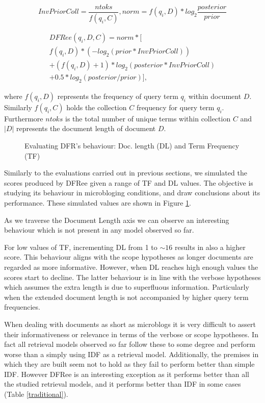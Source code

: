 \begin{equation}
InvPriorColl = \frac{ntoks}{f(q_i, C)}, norm = f(q_i, D)*log_2{\frac{posterior}{prior}}
\end{equation}

\begin{multline}
DFRee(q_i,D,C) = norm * [                    \\
f(q_i, D)*(-log_2(prior*InvPriorColl))       \\
+(f(q_i, D)+1)*log_2(posterior*InvPriorColl) \\
+ 0.5*log_2(posterior/prior)],
\end{multline}

where \(f(q_i, D)\) represents the frequency of query term \(q_i\) within document \(D\). Similarly \(f(q_i, C)\) holds the collection \(C\) frequency for query term \(q_i\). Furthermore \(ntoks\) is the total number of unique terms within collection \(C\) and \(|D|\) represents the document length of document \(D\).

\begin{figure}
	\centering
	\caption{Evaluating DFR's behaviour: Doc. length (DL) and Term Frequency (TF)}
	
	\label{dfrTFDLcomp}
\end{figure} 

Similarly to the evaluations carried out in previous sections, we simulated the scores produced by DFRee given a range of TF and DL values. The objective is studying its behaviour in microbloging conditions, and draw conclusions about its performance. These simulated values are shown in Figure \ref{dfrTFDLcomp}.

As we traverse the Document Length axis we can observe an interesting behaviour which is not present in any model observed so far. 

For low values of TF, incrementing DL from 1 to $\sim16$ results in also a higher score. This behaviour aligns with the scope hypotheses as longer documents are regarded as more informative. However, when DL reaches high enough values the scores start to decline. The latter behaviour is in line with the verbose hypotheses which assumes the extra length is due to superfluous information. Particularly when the extended document length is not accompanied by higher query term frequencies.

When dealing with documents as short as microblogs it is very difficult to assert their informativeness or relevance in terms of the verbose or scope hypotheses. In fact all retrieval models observed so far follow these to some degree and perform worse than a simply using IDF as a retrieval model. Additionally, the premises in which they are built seem not to hold as they fail to perform better than simple IDF. However DFRee is an interesting exception as it performs better than all the studied retrieval models, and it performs better than IDF in some cases (Table \ref{traditional}).

